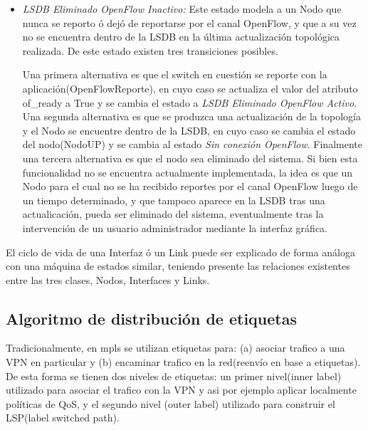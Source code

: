 \begin{itemize}
De este estado existen tres transiciones posibles. Por un lado el nodo puede estar presente en la LSDB al producirse una actualizaci\'on de la topolog\'ia(LSDBSyncActualizarTopologia), actualizandose la informaci\'on del nodo(ActualizarNodo) y manteniéndose en el mismo estado. Por otro lado tambi\'en al producirse una actualizaci\'on de la topolog\'ia, el nodo puede no estar en la LSDB, en cuyo caso se actualiza el estado del nodo(NodoDOWN) y se cambia al estado \textit{LSDB Eliminado OpenFlow Inactivo}. Finalmente el switch puede empezar a reportarse por el canal OpenFlow(OpenFlowReport) en cuyo caso se actualiza el valor del atributo of\_ready a True, y se cambia al estado \textit{Operativo}.  

\item \textit{LSDB Eliminado OpenFlow Inactivo:} Este estado modela a un Nodo que nunca se reporto \'o dej\'o de reportarse por el canal OpenFlow, y que a su vez no se encuentra dentro de la LSDB en la \'ultima actualizaci\'on topol\'ogica realizada. De este estado existen tres transiciones posibles.

Una primera alternativa es que el switch en cuesti\'on se reporte con la aplicaci\'on(OpenFlowReporte), en cuyo caso se actualiza el valor del atributo of\_ready a True y se cambia el estado a \textit{LSDB Eliminado OpenFlow Activo}. Una segunda alternativa es que se produzca una actualizaci\'on de la topolog\'ia y el Nodo se encuentre dentro de la LSDB, en cuyo caso se cambia el estado del nodo(NodoUP) y se cambia al estado \textit{Sin conexión OpenFlow}. Finalmente una tercera alternativa es que el nodo  sea eliminado del sistema. Si bien esta funcionalidad no se encuentra actualmente implementada, la idea es que un Nodo para el cual no se ha recibido reportes por el canal OpenFlow luego de un tiempo determinado, y que tampoco aparece en la LSDB tras una actualicaci\'on, pueda ser eliminado del sistema, eventualmente tras la intervenci\'on de un usuario administrador mediante la interfaz gr\'afica.
  
\end{itemize}

El ciclo de vida de una Interfaz \'o un Link puede ser explicado de forma an\'aloga con una m\'aquina de estados similar, teniendo presente las relaciones existentes entre las tres clases, Nodos, Interfaces y Links.

\subsection{Algoritmo de distribución de etiquetas}
Tradicionalmente, en mpls se utilizan etiquetas para: (a) asociar trafico a una VPN en particular y (b) encaminar trafico en la red(reenvío en base a etiquetas). De esta forma se tienen dos niveles de etiquetas: un primer nivel(inner label) utilizado para asociar el trafico con la VPN y asi por ejemplo aplicar localmente políticas de QoS, y el segundo nivel (outer label) utilizado para construir el LSP(label switched path).\\

